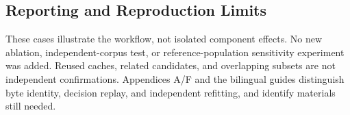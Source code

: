 \documentclass[manuscript,screen,nonacm]{acmart}
\begin{document}
\subsection{Reporting and Reproduction Limits}
\label{sec:evidence-scope}
\label{sec:reproducibility-main}

These cases illustrate the workflow, not isolated component effects.
No new ablation, independent-corpus test, or reference-population
sensitivity experiment was added. Reused caches, related candidates, and
overlapping subsets are not independent confirmations. Appendices A/F
and the bilingual guides distinguish byte identity, decision replay,
and independent refitting, and identify materials still needed.

\clearpage


\end{document}
